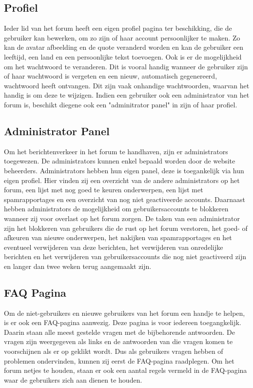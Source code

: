 \documentclass[a4paper,12pt]{article}
\begin{document}
 
\subsection[Profiel]{Profiel}
Ieder lid van het forum heeft een eigen profiel pagina ter beschikking, die de gebruiker kan bewerken, om zo zijn of haar account persoonlijker te maken. Zo kan de avatar afbeelding en de quote veranderd worden en kan de gebruiker een leeftijd, een land en een persoonlijke tekst toevoegen. Ook is er de mogelijkheid om het wachtwoord te veranderen. Dit is vooral handig wanneer de gebruiker zijn of haar wachtwoord is vergeten en een nieuw, automatisch gegenereerd, wachtwoord heeft ontvangen. Dit zijn vaak onhandige wachtwoorden, waarvan het handig is om deze te wijzigen. Indien een gebruiker ook een administrator van het forum is, beschikt diegene ook een "adminitrator panel" in zijn of haar profiel. \\


\subsection[Administrator Paneel]{Administrator Panel}
Om het berichtenverkeer in het forum te handhaven, zijn er administrators toegewezen. De administrators kunnen enkel bepaald worden door de website beheerders. Administrators hebben hun eigen panel, deze is toegankelijk via hun eigen profiel. Hier vinden zij een overzicht van de andere administrators op het forum, een lijst met nog goed te keuren onderwerpen, een lijst met spamrapportages en een overzicht van nog niet geactiveerde accounts. Daarnaast hebben administrators de mogelijkheid om gebruikersaccounts te blokkeren wanneer zij voor overlast op het forum zorgen. De taken van een administrator zijn het blokkeren van gebruikers die de rust op het forum verstoren, het goed- of afkeuren van nieuwe onderwerpen, het nakijken van spamrapportages en het eventueel verwijderen van deze berichten, het verwijderen van onredelijke berichten en het verwijderen van gebruikersaccounts die nog niet geactiveerd zijn en langer dan twee weken terug aangemaakt zijn. \\


\subsection[FAQ Pagina]{FAQ Pagina}
Om de niet-gebruikers en nieuwe gebruikers van het forum een handje te helpen, is er ook een FAQ-pagina aanwezig. Deze pagina is voor iedereen toegangkelijk. Daarin staan alle meest gestelde vragen met de bijbehorende antwoorden. De vragen zijn weergegeven als links en de antwoorden van die vragen komen te voorschijnen als er op geklikt wordt. Dus als gebruikers vragen hebben of problemen ondervinden, kunnen zij eerst de FAQ-pagina raadplegen. Om het forum netjes te houden, staan er ook een aantal regels vermeld in de FAQ-pagina waar de gebruikers zich aan dienen te houden.
\end{document}
